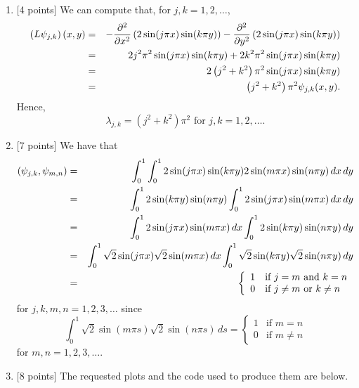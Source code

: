\begin{solution}
\begin{enumerate}
\item {[4 points]} We can compute that, for $j,k=1,2,\ldots$,
\begin{eqnarray*}
\left(L \psi_{j,k}\right)(x,y) &=& -{\partial^2 \over \partial x^2} \left(2\sin(j\pi x)\sin(k\pi y)\right)-{\partial^2 \over \partial y^2} \left(2\sin(j\pi x)\sin(k\pi y)\right)
\\
&=& 2j^2\pi^2 \sin(j\pi x)\sin(k\pi y)+2k^2 \pi^2 \sin(j\pi x)\sin(k\pi y)
\\
&=& 2\left(j^2 + k^2\right)\pi^2 \sin(j\pi x)\sin(k\pi y)
\\
&=& \left(j^2 + k^2\right)\pi^2\psi_{j,k}(x,y).
\end{eqnarray*}
Hence,
\[
\lambda_{j,k}=(j^2+k^2)\pi^2\mbox{ for }j,k=1,2,\ldots.
\]

\item {[7 points]} We have that
\begin{eqnarray*}
(\psi_{j,k}, \psi_{m,n}) &=& \int_0^1 \int_0^1 2\sin(j\pi x) \sin(k\pi y) 2\sin(m\pi x) \sin(n\pi y)\,dx\,dy
\\
&=& \int_0^1 2\sin(k\pi y) \sin(n\pi y) \int_0^1 2\sin(j\pi x) \sin(m\pi x) \,dx\,dy
\\
&=& \int_0^1 2\sin(j\pi x) \sin(m\pi x) \,dx\int_0^1 2\sin(k\pi y) \sin(n\pi y) \,dy
\\
&=& \int_0^1 \sqrt{2}\sin(j\pi x)\sqrt{2}\sin(m\pi x)\, dx \int_0^1 \sqrt{2}\sin(k\pi y)\sqrt{2}\sin(n\pi y)\, dy
\\
&=& \left\{\begin{array}{ll} 1 & \mbox{if }j=m\mbox{ and }k=n \\ 0 & \mbox{if }j\ne m\mbox{ or }k\ne n \end{array}\right.\end{eqnarray*}
for $j,k,m,n=1,2,3,\ldots$ since
\[
 \int_0^1 \sqrt{2}\sin(m\pi s)\sqrt{2}\sin(n\pi s)\, ds=\left\{\begin{array}{ll} 1 & \mbox{if }m=n \\ 0 & \mbox{if }m\ne n \end{array}\right.
\]
for $m,n=1,2,3,\ldots$.
    
\item {[8 points]} The requested plots and the code used to produce them are below.


\end{enumerate}
\end{solution}
